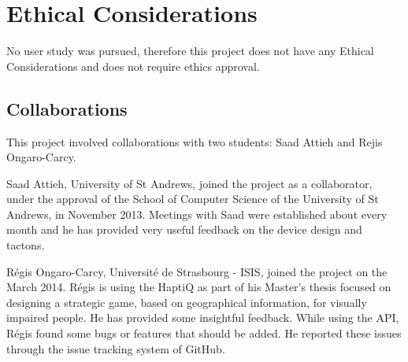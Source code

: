 \chapter{Ethical Considerations}

No user study was pursued, therefore this project does not have any Ethical Considerations and does not require ethics approval.\newline \par

\section{Collaborations}
\label{sec:collaborators}
This project involved collaborations with two students: Saad Attieh and Rejis Ongaro-Carcy.  

Saad Attieh, University of St Andrews, joined the project as a collaborator, under the approval of the School of Computer Science of the University of St Andrews, in November 2013. Meetings with Saad were established about every month and he has provided very useful feedback on the device design and tactons. 

Régis Ongaro-Carcy, Université de Strasbourg - ISIS, joined the project on the  March 2014. Régis is using the HaptiQ as part of his Master's thesis focused on designing a strategic game, based on geographical information, for visually impaired people. He has provided some insightful feedback. While using the API, Régis found some bugs or features that should be added. He reported these issues through the issue tracking system of GitHub.